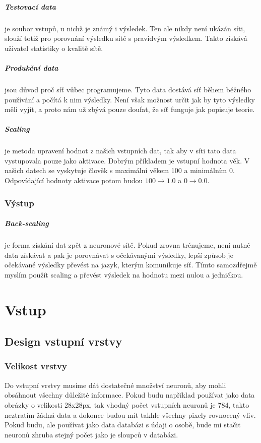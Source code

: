 \documentclass[12pt,a4paper]{report}
\begin{document}
			\paragraph{Testovací data}
			je soubor vstupů, u nichž je známý i výsledek. Ten ale nikdy není ukázán síti, slouží totiž pro porovnání výsledku sítě s pravidvým výsledkem. Takto získává uživatel statistiky o kvalitě sítě.
			\paragraph{Produkční data}
			jsou důvod proč síť vůbec programujeme. Tyto data dostává síť během běžného používání a počítá k nim výsledky. Není však možnost určit jak by tyto výsledky měli vyjít, a proto nám už zbývá pouze doufat, že síť funguje jak popisuje teorie.
		\paragraph{Scaling}
		je metoda upravení hodnot z našich vstupních dat, tak aby v síti tato data vystupovala pouze jako aktivace. Dobrým příkladem je vstupní hodnota věk. V našich datech se vyskytuje člověk s maximální věkem 100 a minimálním 0. Odpovídající hodnoty aktivace potom budou $100\rightarrow1.0$ a $0\rightarrow0.0$.
	\subsection{Výstup}
		\paragraph{Back-scaling}
		je forma získání dat zpět z neuronové sítě. Pokud zrovna trénujeme, není nutné data získávat a pak je porovnávat s očekávanými výsledky, lepší způsob je očekávané výsledky převést na jazyk, kterým komunikuje síť. Tímto samozdřejmě myslím použít scaling a převést výsledek na hodnotu mezi nulou a jedničkou.
	
\chapter{Vstup}
	\section{Design vstupní vrstvy}
		\subsection{Velikost vrstvy}
		Do vstupní vrstvy musíme dát dostatečné množství neuronů, aby mohli obsáhnout všechny důležité informace. Pokud budu například používat jako data obrázky o velikosti 28x28px, tak vhodný počet vstupních neuronů je 784, takto neztratím žádná data a dokonce budou mít takhle všechny pixely rovnocený vliv. Pokud budu, ale používat jako data databázi s údaji o osobě, bude mi stačit neuronů zhruba stejný počet jako je sloupců v databázi.
\end{document}
